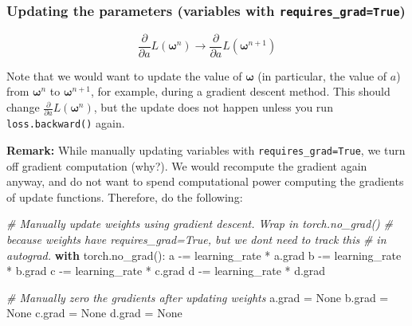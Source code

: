 \documentclass[
]{article}
\newenvironment{Shaded}{}{}
\newcommand{\CommentTok}[1]{\textcolor[rgb]{0.38,0.63,0.69}{\textit{#1}}}
\newcommand{\ControlFlowTok}[1]{\textcolor[rgb]{0.00,0.44,0.13}{\textbf{#1}}}
\newcommand{\NormalTok}[1]{#1}
\newcommand{\OperatorTok}[1]{\textcolor[rgb]{0.40,0.40,0.40}{#1}}
\newcommand{\VariableTok}[1]{\textcolor[rgb]{0.10,0.09,0.49}{#1}}
\begin{document}
\hypertarget{updating-the-parameters-variables-with-requires_gradtrue}{%
\subsubsection{\texorpdfstring{Updating the parameters (variables with
\texttt{requires\_grad=True})}{Updating the parameters (variables with requires\_grad=True)}}\label{updating-the-parameters-variables-with-requires_gradtrue}}

\[\frac{\partial}{\partial a}L(\boldsymbol{\omega}^n)
\to \frac{\partial}{\partial a}L(\boldsymbol{\omega}^{n+1})\]

Note that we would want to update the value of \(\boldsymbol{\omega}\)
(in particular, the value of \(a\)) from \(\boldsymbol{\omega}^n\) to
\(\boldsymbol{\omega}^{n+1}\), for example, during a gradient descent
method. This should change
\(\frac{\partial}{\partial a}L(\boldsymbol{\omega}^n)\), but the update
does not happen unless you run \texttt{loss.backward()} again.

\textbf{Remark:} While manually updating variables with
\texttt{requires\_grad=True}, we turn off gradient computation (why?).
We would recompute the gradient again anyway, and do not want to spend
computational power computing the gradients of update functions.
Therefore, do the following:

\begin{Shaded}
\begin{Highlighting}[]
\CommentTok{\# Manually update weights using gradient descent. Wrap in torch.no\_grad()}
\CommentTok{\# because weights have requires\_grad=True, but we don\textquotesingle{}t need to track this}
\CommentTok{\# in autograd.}
\ControlFlowTok{with}\NormalTok{ torch.no\_grad():}
\NormalTok{    a }\OperatorTok{{-}=}\NormalTok{ learning\_rate }\OperatorTok{*}\NormalTok{ a.grad}
\NormalTok{    b }\OperatorTok{{-}=}\NormalTok{ learning\_rate }\OperatorTok{*}\NormalTok{ b.grad}
\NormalTok{    c }\OperatorTok{{-}=}\NormalTok{ learning\_rate }\OperatorTok{*}\NormalTok{ c.grad}
\NormalTok{    d }\OperatorTok{{-}=}\NormalTok{ learning\_rate }\OperatorTok{*}\NormalTok{ d.grad}

    \CommentTok{\# Manually zero the gradients after updating weights}
\NormalTok{    a.grad }\OperatorTok{=} \VariableTok{None}
\NormalTok{    b.grad }\OperatorTok{=} \VariableTok{None}
\NormalTok{    c.grad }\OperatorTok{=} \VariableTok{None}
\NormalTok{    d.grad }\OperatorTok{=} \VariableTok{None}
\end{Highlighting}
\end{Shaded}
\end{document}
